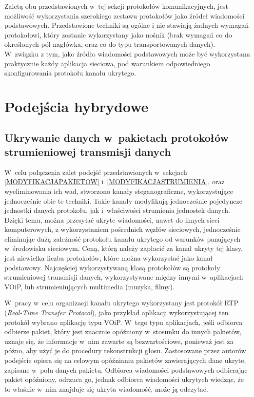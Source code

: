 \documentclass[a4paper, twoside, openright, 12pt]{report}
\begin{document}
        Zaletą obu przedstawionych w~tej sekcji protokołów komunikacyjnych,
        jest możliwość wykorzystania szerokiego zestawu protokołów jako
        źródeł wiadomości podstawowych. Przedstawione techniki są ogólne i
        nie stawiają żadnych wymagań protokołowi, który zostanie wykorzystany jako
        nośnik (brak wymagań co do określonych pól nagłówka, oraz co do typu transportowanych danych).
        W~związku z tym, jako źródło wiadomości podstawowych może być wykorzystana
        praktycznie każdy aplikacja sieciowa, pod warunkiem odpowiedniego skonfigurowania
        protokołu kanału ukrytego.


    \section{Podejścia hybrydowe}
        \subsection{Ukrywanie danych w~pakietach protokołów strumieniowej transmisji danych}
        W~celu połączenia zalet podejść przedstawionych w~sekcjach
        \ref{MODYFIKACJAPAKIETOW} i~\ref{MODYFIKACJASTRUMIENIA}, oraz wyeliminowania
        ich wad, stworzono kanały steganograficzne, wykorzystujące jednocześnie obie te
        techniki. Takie kanały modyfikują jednocześnie pojedyncze jednostki danych protokołu,
        jak i~właściwości strumienia jednostek danych. Dzięki temu, można przesyłać ukryte wiadomości,
        nawet do innych sieci komputerowych, z wykorzystaniem pośrednich węzłów sieciowych,
        jednocześnie eliminując dużą zależność protokołu kanału ukrytego od warunków
        panujących w~środowisku sieciowym. Ceną, którą należy zapłacić za kanał
        ukryty tej klasy, jest niewielka liczba protokołów, które można wykorzystać
        jako kanał podstawowy. Najczęściej wykorzystywaną klasą protokołów są
        protokoły strumieniowej transmisji danych, wykorzystywane między innymi
        w~aplikacjach VOiP, lub strumieniujących multimedia (muzyka, filmy).

        W~pracy \cite{VOIPSTEGANOGRAPHY} w~celu organizacji kanału ukrytego wykorzystany
        jest protokół RTP (\emph{Real-Time Transfer Protocol}), jako przykład aplikacji
        wykorzystującej ten protokół wybrano aplikację typu VOiP. W~tego typu aplikacjach,
        jeśli odbiorca odbierze pakiet, który jest znacznie opóźniony w~stosunku
        do innych pakietów, uznaje się, że informacje w~nim zawarte są bezwartościowe,
        ponieważ jest za późno, aby użyć je do procedury rekonstrukcji głosu.
        Zastosowane przez autorów podejście opiera się na celowym opóźnianiu pakietów
        zawierających dane ukryte, zapisane w~polu danych pakietu.
        Odbiorca wiadomości podstawowych odbierając pakiet
        opóźniony, odrzuca go, jednak odbiorca wiadomości ukrytych wiedząc, że to właśnie
        w~nim znajduje się ukryta wiadomość, może ją odczytać.
\end{document}

